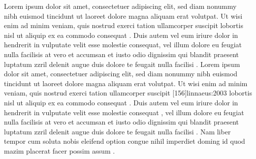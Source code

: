 \documentclass[a4paper,12pt]{scrartcl}
\begin{document}
    {Lorem ipsum dolor sit amet, consectetuer adipiscing elit, sed diam nonummy nibh euismod tincidunt ut laoreet dolore magna aliquam erat volutpat. Ut wisi enim ad minim veniam, quis nostrud exerci tation ullamcorper suscipit lobortis nisl ut aliquip ex ea commodo consequat \autocite{auler:hiller:2015}. Duis autem vel eum iriure dolor in hendrerit in vulputate velit esse molestie consequat, vel illum dolore eu feugiat nulla facilisis at vero et accumsan et iusto odio dignissim qui blandit praesent luptatum zzril delenit augue duis dolore te feugait nulla facilisi \autocites[68]{auler:hiller:2011}[48]{auler:hiller:2015a}[159--187]{auler:hiller:2015}[40--41]{auler:hiller:2016}[15--23]{tacitus:1981}[19]{de:neck:yoder:1978}[69]{auler:hiller:2011}. Lorem ipsum dolor sit amet, consectetuer adipiscing elit, sed diam nonummy nibh euismod tincidunt ut laoreet dolore magna aliquam erat volutpat. Ut wisi enim ad minim veniam, quis nostrud exerci tation ullamcorper suscipit [156]{linnaeus:2003} lobortis nisl ut aliquip ex ea commodo consequat \autocite{kenmore}. Duis autem vel eum iriure dolor in hendrerit in vulputate velit esse molestie consequat \autocites[73--75]{mueller:f:1991}[105--108]{mueller:a:1991}[68--70]{mueller:h:1900}[61]{mueller:har:1988}, vel illum dolore eu feugiat nulla facilisis at vero et accumsan et iusto odio dignissim qui blandit praesent luptatum zzril delenit augue duis dolore te feugait nulla facilisi \autocite{kenmore}. Nam liber tempor cum soluta nobis eleifend option congue nihil imperdiet doming id quod mazim placerat facer possim assum \autocite[145--146]{todorova:et:al:1981}.}
\end{document}
